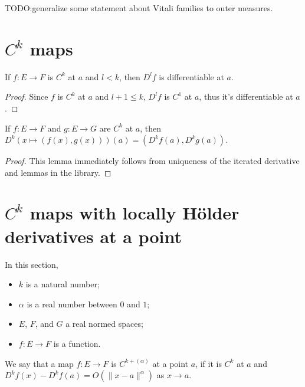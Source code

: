 TODO:\@ generalize some statement about Vitali families to outer measures.

\section{\(C^k\) maps}%
\label{sec:ck-maps}

\begin{lemma}%
  \label{lem:Ck-differentiable-iteratedFDeriv}
  \leanok%
  If \(f \colon E \to F\) is \(C^{k}\) at \(a\) and \(l < k\),
  then \(D^{l}f\) is differentiable at \(a\).
\end{lemma}
\begin{proof}
  \leanok%
  Since \(f\) is \(C^{k}\) at \(a\) and \(l + 1 \le k\),
  \(D^{l}f\) is \(C^{1}\) at \(a\),
  thus it's differentiable at \(a\).
\end{proof}

\begin{lemma}%
  \label{lem:iteratedFDeriv-prod}
  If \(f\colon E \to F\) and \(g\colon E \to G\) are \(C^{k}\) at \(a\),
  then \(D^{k}(x \mapsto (f(x), g(x)))(a) = (D^{k}f(a), D^{k}g(a))\).
\end{lemma}
\begin{proof}
  This lemma immediately follows from uniqueness of the iterated derivative
  and lemmas in the library.
\end{proof}

\section{\(C^{k}\) maps with locally Hölder derivatives at a point}%
\label{sec:cdh-at}

In this section,
\begin{itemize}
\item \(k\) is a natural number;
\item \(\alpha\) is a real number between \(0\) and \(1\);
\item \(E\), \(F\), and \(G\) a real normed spaces;
\item \(f\colon E \to F\) is a function.
\end{itemize}

\begin{definition}%
  \label{def:cdh-at}
  \leanok%
  We say that a map \(f\colon E\to F\) is \emph{\(C^{k+(\alpha)}\)} at a point \(a\),
  if it is \(C^{k}\) at \(a\) and \(D^{k}f(x) - D^{k}f(a) = O(\|x - a\|^{\alpha})\) as \(x\to a\).
\end{definition}

